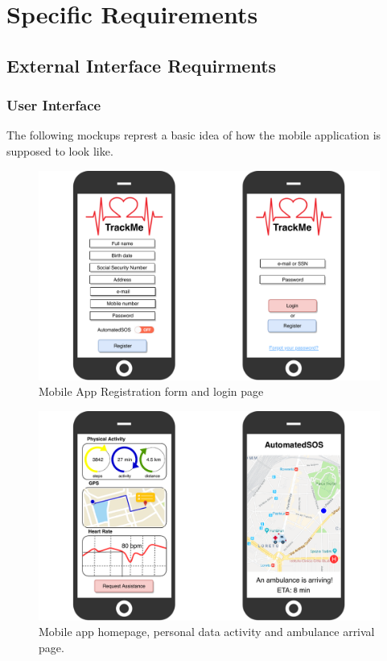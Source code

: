 \documentclass[12pt,a4paper]{article}
\begin{document}
	\newpage
	\section{Specific Requirements}
	\subsection{External Interface Requirments}
	\subsubsection{User Interface}
	The following mockups represt a basic idea of how the mobile application is supposed to look like.\\
	\begin{figure}[h]
	  \centering
	  \includegraphics[width=1.0\linewidth]{Images/login-registration}
	  \caption{Mobile App Registration form and login page}
	  \label{fig:login-registration}
	\end{figure}
	\begin{figure}
	   	\centering
	   	\includegraphics[width=1.0\linewidth]{Images/pages}
		\caption{Mobile app homepage, personal data activity and ambulance arrival page.}
		\label{fig:pages}
	 \end{figure}
 
\end{document}
